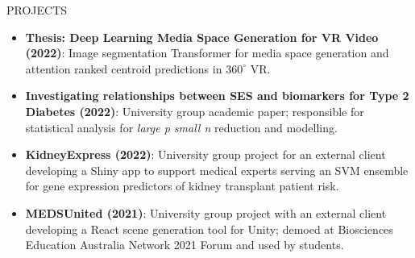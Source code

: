 
\begin{ResumeSection}{PROJECTS}
    \begin{itemize}
        \item \textbf{Thesis: Deep Learning Media Space Generation for VR Video (2022)}: Image segmentation Transformer for media space generation and attention ranked centroid predictions in $360^\circ$ VR.\vspace{-0.25em}
        \item \textbf{Investigating relationships between SES and biomarkers for Type 2 Diabetes (2022)}: University group academic paper; responsible for statistical analysis for \textit{large p small n} reduction and modelling.\vspace{-0.25em}
        \item \textbf{KidneyExpress (2022)}: University group project for an external client developing a Shiny app to support medical experts serving an SVM ensemble for gene expression predictors of kidney transplant patient risk.\vspace{-0.25em}
        \item \textbf{MEDSUnited (2021)}: University group project with an external client developing a React scene generation tool for Unity; demoed at Biosciences Education Australia Network 2021 Forum and used by students.
    \end{itemize}
\end{ResumeSection} 